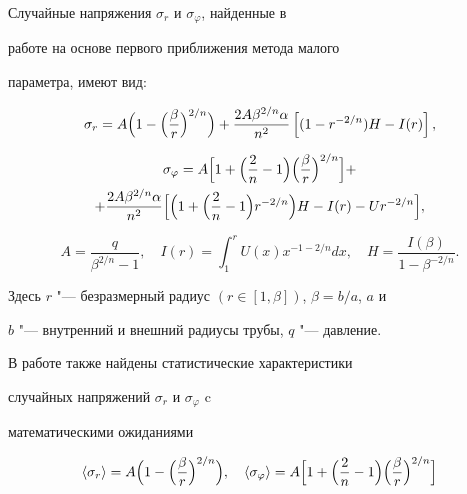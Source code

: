 Случайные напряжения $\sigma _r$ и $\sigma _\varphi$, найденные в

работе \cite{popovkoval:bib:RadchPopov} на основе первого приближения метода малого

параметра, имеют вид:



\begin{equation}

\sigma _{r} = A\Bigl( 1 - \Bigl( {\frac{\beta}{r}} \Bigr)^{2/n}

\Bigr)+\frac{2A{\beta}^{2/n}\alpha}{n^2}\left[

(1-r^{-2/n})H - I(r)\right],

\label{eq:kov:2}

\end{equation}

\begin{multline}

\sigma _{\varphi} = 

A\Bigl[ 1 + \Bigl(\frac{2}{n}-1\Bigr)\Bigl( {\frac{\beta}{r}} \Bigr)^{2/n} \Bigr] + \\ +\frac{2A{\beta}^{2/n}\alpha}{n^2}

\Bigl[

\Bigl(1+\Bigl(\frac{2}{n}-1\Bigr)r^{-2/n}\Bigr)H - I(r)-Ur^{-2/n}\Bigr], \label{eq:kov:3}

\end{multline}

\[

A = \frac{q}{\beta^{2/n}-1}, \quad I (r) =

 \int _1^r {U\left( x \right)x^{ - 1 -2/n}dx},  \quad H =

\frac{I ( \beta )}{1 - {\beta}^{-2/n}}.

\]

Здесь $r$ "---  безразмерный радиус $(r\in[1, \beta])$, $\beta={b}/{a}$, $a$ и

$b$ "---  внутренний и внешний радиусы трубы, $q$ "---  давление.



В работе \cite{popovkoval:bib:RadchPopov} также найдены статистические характеристики

случайных напряжений $\sigma _r$ и $\sigma _{\varphi}$ c

математическими ожиданиями

\begin{gather}

\langle\sigma

_r\rangle=A\Bigl(1-\Bigl(\frac{\beta}{r}\Bigr)^{2/n}\Bigr),

\quad

\langle\sigma _{\varphi}\rangle=A\Bigl[1+\Bigl(\frac{2}{n}-1\Bigr)\Bigl(\frac{\beta}{r}\Bigr )^{2/n}\Bigr]

\end{gather}

